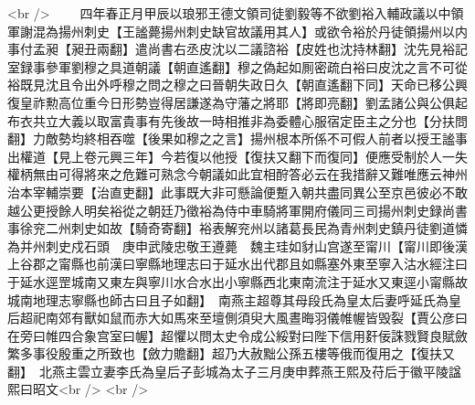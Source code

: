 <br />
　　四年春正月甲辰以琅邪王德文領司徒劉毅等不欲劉裕入輔政議以中領軍謝混為揚州刺史【王謐薨揚州刺史缺官故議用其人】或欲令裕於丹徒領揚州以内事付孟昶【昶丑兩翻】遣尚書右丞皮沈以二議諮裕【皮姓也沈持林翻】沈先見裕記室録事參軍劉穆之具道朝議【朝直遙翻】穆之偽起如厠密疏白裕曰皮沈之言不可從裕既見沈且令出外呼穆之問之穆之曰晉朝失政日久【朝直遙翻下同】天命已移公興復皇祚勲高位重今日形勢豈得居謙遂為守藩之將耶【將即亮翻】劉孟諸公與公俱起布衣共立大義以取富貴事有先後故一時相推非為委體心服宿定臣主之分也【分扶問翻】力敵勢均終相吞噬【後果如穆之之言】揚州根本所係不可假人前者以授王謐事出權道【見上卷元興三年】今若復以他授【復扶又翻下而復同】便應受制於人一失權柄無由可得將來之危難可熟念今朝議如此宜相酧答必云在我措辭又難唯應云神州治本宰輔崇要【治直吏翻】此事既大非可懸論便蹔入朝共盡同異公至京邑彼必不敢越公更授餘人明矣裕從之朝廷乃徵裕為侍中車騎將軍開府儀同三司揚州刺史録尚書事徐兖二州刺史如故【騎奇寄翻】裕表解兖州以諸葛長民為青州刺史鎮丹徒劉道憐為并州刺史戍石頭　庚申武陵忠敬王遵薨　魏主珪如豺山宫遂至甯川【甯川即後漢上谷郡之甯縣也前漢曰寧縣地理志曰于延水出代郡且如縣塞外東至寧入沽水經注曰于延水逕罡城南又東左與寧川水合水出小寧縣西北東南流注于延水又東逕小甯縣故城南地理志寧縣也師古曰且子如翻】　南燕主超尊其母段氏為皇太后妻呼延氏為皇后超祀南郊有獸如鼠而赤大如馬來至壇側須臾大風晝晦羽儀帷幄皆毁裂【賈公彦曰在旁曰帷四合象宫室曰幄】超懼以問太史令成公綏對曰陛下信用姧佞誅戮賢良賦斂繁多事役殷重之所致也【斂力贍翻】超乃大赦黜公孫五樓等俄而復用之【復扶又翻】　北燕主雲立妻李氏為皇后子彭城為太子三月庚申葬燕王熙及苻后于徽平陵諡熙曰昭文<br />
<br />
